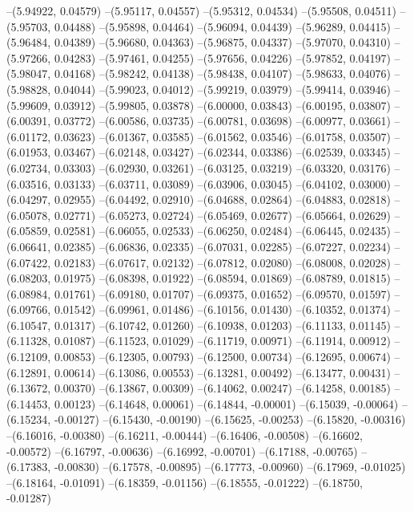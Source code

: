 --(5.94922, 0.04579)
--(5.95117, 0.04557)
--(5.95312, 0.04534)
--(5.95508, 0.04511)
--(5.95703, 0.04488)
--(5.95898, 0.04464)
--(5.96094, 0.04439)
--(5.96289, 0.04415)
--(5.96484, 0.04389)
--(5.96680, 0.04363)
--(5.96875, 0.04337)
--(5.97070, 0.04310)
--(5.97266, 0.04283)
--(5.97461, 0.04255)
--(5.97656, 0.04226)
--(5.97852, 0.04197)
--(5.98047, 0.04168)
--(5.98242, 0.04138)
--(5.98438, 0.04107)
--(5.98633, 0.04076)
--(5.98828, 0.04044)
--(5.99023, 0.04012)
--(5.99219, 0.03979)
--(5.99414, 0.03946)
--(5.99609, 0.03912)
--(5.99805, 0.03878)
--(6.00000, 0.03843)
--(6.00195, 0.03807)
--(6.00391, 0.03772)
--(6.00586, 0.03735)
--(6.00781, 0.03698)
--(6.00977, 0.03661)
--(6.01172, 0.03623)
--(6.01367, 0.03585)
--(6.01562, 0.03546)
--(6.01758, 0.03507)
--(6.01953, 0.03467)
--(6.02148, 0.03427)
--(6.02344, 0.03386)
--(6.02539, 0.03345)
--(6.02734, 0.03303)
--(6.02930, 0.03261)
--(6.03125, 0.03219)
--(6.03320, 0.03176)
--(6.03516, 0.03133)
--(6.03711, 0.03089)
--(6.03906, 0.03045)
--(6.04102, 0.03000)
--(6.04297, 0.02955)
--(6.04492, 0.02910)
--(6.04688, 0.02864)
--(6.04883, 0.02818)
--(6.05078, 0.02771)
--(6.05273, 0.02724)
--(6.05469, 0.02677)
--(6.05664, 0.02629)
--(6.05859, 0.02581)
--(6.06055, 0.02533)
--(6.06250, 0.02484)
--(6.06445, 0.02435)
--(6.06641, 0.02385)
--(6.06836, 0.02335)
--(6.07031, 0.02285)
--(6.07227, 0.02234)
--(6.07422, 0.02183)
--(6.07617, 0.02132)
--(6.07812, 0.02080)
--(6.08008, 0.02028)
--(6.08203, 0.01975)
--(6.08398, 0.01922)
--(6.08594, 0.01869)
--(6.08789, 0.01815)
--(6.08984, 0.01761)
--(6.09180, 0.01707)
--(6.09375, 0.01652)
--(6.09570, 0.01597)
--(6.09766, 0.01542)
--(6.09961, 0.01486)
--(6.10156, 0.01430)
--(6.10352, 0.01374)
--(6.10547, 0.01317)
--(6.10742, 0.01260)
--(6.10938, 0.01203)
--(6.11133, 0.01145)
--(6.11328, 0.01087)
--(6.11523, 0.01029)
--(6.11719, 0.00971)
--(6.11914, 0.00912)
--(6.12109, 0.00853)
--(6.12305, 0.00793)
--(6.12500, 0.00734)
--(6.12695, 0.00674)
--(6.12891, 0.00614)
--(6.13086, 0.00553)
--(6.13281, 0.00492)
--(6.13477, 0.00431)
--(6.13672, 0.00370)
--(6.13867, 0.00309)
--(6.14062, 0.00247)
--(6.14258, 0.00185)
--(6.14453, 0.00123)
--(6.14648, 0.00061)
--(6.14844, -0.00001)
--(6.15039, -0.00064)
--(6.15234, -0.00127)
--(6.15430, -0.00190)
--(6.15625, -0.00253)
--(6.15820, -0.00316)
--(6.16016, -0.00380)
--(6.16211, -0.00444)
--(6.16406, -0.00508)
--(6.16602, -0.00572)
--(6.16797, -0.00636)
--(6.16992, -0.00701)
--(6.17188, -0.00765)
--(6.17383, -0.00830)
--(6.17578, -0.00895)
--(6.17773, -0.00960)
--(6.17969, -0.01025)
--(6.18164, -0.01091)
--(6.18359, -0.01156)
--(6.18555, -0.01222)
--(6.18750, -0.01287)
